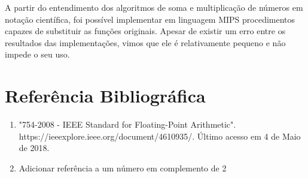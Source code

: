 \documentclass[12pt, a4paper, twoside]{article}
\begin{document}
A partir do entendimento dos algoritmos de soma e multiplicação de números em
notação científica, foi possível implementar em linguagem MIPS procedimentos
capazes de substituir as funções originais. Apesar de existir um erro entre os
resultados das implementações, vimos que ele é relativamente pequeno e não
impede o seu uso.

\section{Referência Bibliográfica}

\begin{enumerate}
    \item "754-2008 - IEEE Standard for Floating-Point Arithmetic".
    https://ieeexplore.ieee.org/document/4610935/. Último acesso em 4 de Maio
    de 2018.
    \item Adicionar referência a um número em complemento de 2 %
\end{enumerate}
\end{document}
